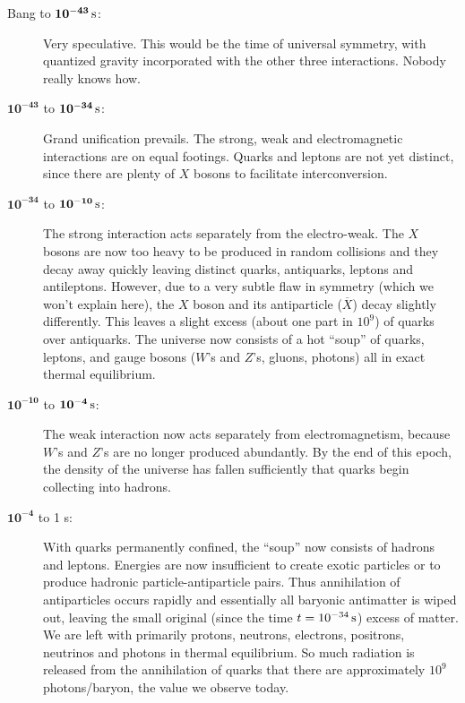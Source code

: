 \begin{description}

\item[Bang to $\mathbf{10^{-43}}\,\mbox{s}$:] Very speculative.  This would be
  the time of universal symmetry, with quantized gravity incorporated
  with the other three interactions.  Nobody really knows how.

\item[$\mathbf{10^{-43}}$ to $\mathbf{10^{-34}}\,\mbox{s}$:] Grand
  unification prevails.  The strong, weak and electromagnetic
  interactions are on equal footings.  Quarks and leptons are not yet
  distinct, since there are plenty of $X$ bosons to facilitate
  interconversion.

\item[$\mathbf{10^{-34}}$ to $\mathbf{10^{-10}}\,\mbox{s}$:] The strong
  interaction acts separately from the electro-weak.  The $X$ bosons
  are now too heavy to be produced in random collisions and they decay
  away quickly leaving distinct quarks, antiquarks, leptons and
  antileptons.  However, due to a very subtle flaw in symmetry (which
  we won't explain here), the $X$ boson and its antiparticle
  ($\overline X$) decay slightly differently.  This leaves a slight
  excess (about one part in $10^9$) of quarks over antiquarks.  The
  universe now consists of a hot ``soup'' of quarks, leptons, and
  gauge bosons ($W$'s and $Z$'s, gluons, photons) all in exact thermal
  equilibrium.

\item[$\mathbf{10^{-10}}$ to $\mathbf{10^{-4}}\,\mbox{s}$:] The weak
  interaction now acts separately from electromagnetism, because $W$'s
  and $Z$'s are no longer produced abundantly.  By the end of this
  epoch, the density of the universe has fallen sufficiently that
  quarks begin collecting into hadrons.

\item[$\mathbf{10^{-4}}$ to 1 s:] With quarks permanently confined,
  the ``soup'' now consists of hadrons and leptons.  Energies are now
  insufficient to create exotic particles or to produce hadronic
  particle-antiparticle pairs. Thus annihilation of antiparticles
  occurs rapidly and essentially all baryonic antimatter is wiped out,
  leaving the small original (since the time $t=10^{-34}\,\mbox{s}$) excess of
  matter.  We are left with primarily protons, neutrons, electrons,
  positrons, neutrinos and photons in thermal equilibrium.  So much
  radiation is released from the annihilation of quarks that there are
  approximately $10^9$ photons/baryon, the value we observe today.


\end{description}
